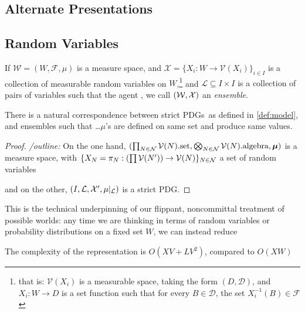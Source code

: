\documentclass{article}
\newcommand\bmu{\boldsymbol{\mu}}
\newcommand{\MN}{PDG}
\newcommand{\MNs}{\MN s}
\begin{document}
	\begin{vfull}
		\section{Alternate Presentations}
		\subsection{Random Variables}
		If $\mathcal W = (W, \mathcal F, \mu)$ is a measure space, and $\mathcal X = \{ X_i: W \to \mathcal V(X_i) \}_{i \in I} $ is a collection of measurable random variables on $W$,\footnote{that is: $\mathcal V(X_i)$ is a measurable space, taking the form $(D, \mathcal D)$, and $X_i : W \to D$ is a set function such that for every $B \in \mathcal D$, the set $X_i^{-1}(B) \in \mathcal F$} and 
		{\color{gray}$\mathcal L \subseteq I \times I$ is a collection of pairs of variables such that the agent } 
		, we call $(\cal W, X)$ an \emph{ensemble}.
		
		
		\begin{prop}
			There is a natural correspondence between strict \MNs\ as defined in \cref{def:model}, and ensembles such that  \ldots $\mu$'s are defined on same set and produce same values.
		\end{prop}
		\begin{proof}
			\textit{/outline:}
			On the one hand, $(\prod_{N \in \cal N} \mathcal V(N).\text{set}, \bigotimes_{N \in \cal N} \mathcal V(N).\text{algebra}, \bmu)$ is a measure space, with $\{X_N = \pi_N : \left(\prod\mathcal V(N')\right) \to  \mathcal V(N) \}_{N \in \cal N}$ a set of random variables
			
			and  on the other, $(I, \mathcal L, \mathcal X', \mu|_{\cal L})$ is a strict \MN.
		\end{proof}
		
		This is the technical underpinning of our flippant, noncommittal treatment of possible worlds: any time we are thinking in terms of random variables or probability distributions on a fixed set $W$, we can instead reduce
		
		
		The complexity of the representation is $O(XV + L V^2)$, compared to $O(XW)$
	\end{vfull}
	
\end{document}

